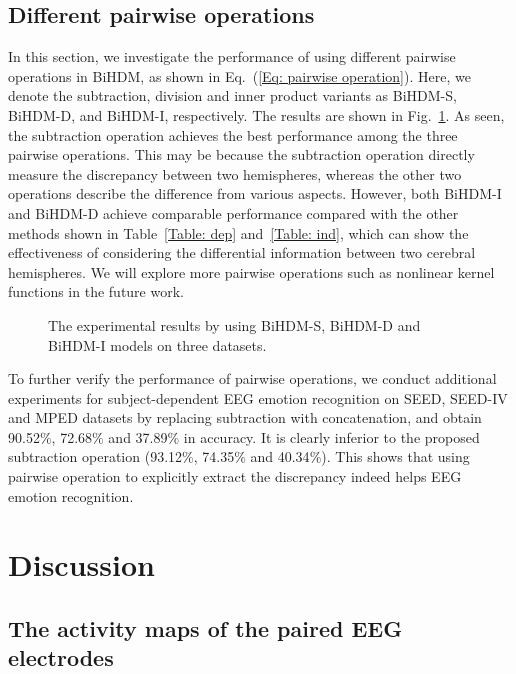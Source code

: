\documentclass[journal]{IEEEtran}
\begin{document}
\subsection{Different pairwise operations}
\label{Section: different pairwise operations}
In this section, we investigate the performance of using different pairwise operations in BiHDM, as shown in Eq.~(\ref{Eq: pairwise operation}). Here, we denote the subtraction, division and inner product variants as BiHDM-S, BiHDM-D, and BiHDM-I, respectively. The results are shown in Fig.~\ref{Fig: different pairwise operations}. As seen, the subtraction operation achieves the best performance among the three pairwise operations. This may be because the subtraction operation directly measure the discrepancy between two hemispheres, whereas the other two operations describe the difference from various aspects. However, both BiHDM-I and BiHDM-D achieve comparable performance compared with the other methods shown in Table~\ref{Table: dep} and~\ref{Table: ind}, which can show the effectiveness of considering the differential information between two cerebral hemispheres. We will explore more pairwise operations such as nonlinear kernel functions in the future work.
\begin{figure}[htb]
	\caption{The experimental results by using BiHDM-S, BiHDM-D and BiHDM-I models on three datasets.}
	\label{Fig: different pairwise operations}
\end{figure}

To further verify the performance of pairwise operations, we conduct additional experiments for subject-dependent EEG emotion recognition on SEED, SEED-IV and MPED datasets by replacing subtraction with concatenation, and obtain 90.52$\%$, 72.68$\%$ and 37.89$\%$ in accuracy. It is clearly inferior to the proposed subtraction operation (93.12$\%$, 74.35$\%$ and 40.34$\%$). This shows that using pairwise operation to explicitly extract the discrepancy indeed helps EEG emotion recognition.


\section{Discussion}
\label{Sec: Discussion}
\subsection{The activity maps of the paired EEG electrodes}
\end{document}
